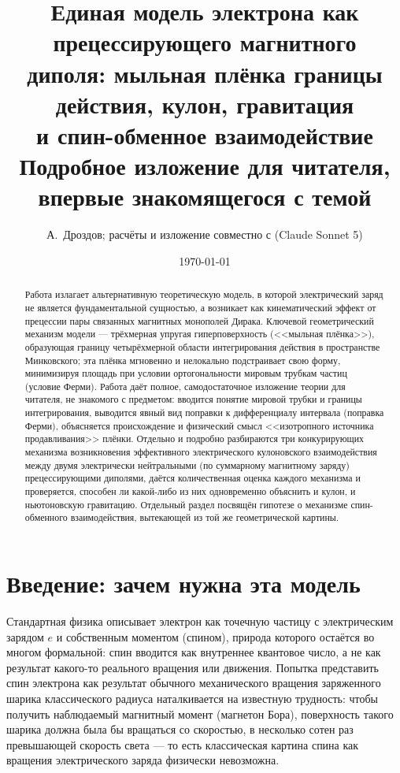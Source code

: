 \documentclass[12pt,a4paper]{article}
\title{Единая модель электрона как прецессирующего магнитного\\
диполя: мыльная плёнка границы действия, кулон, гравитация\\
и спин-обменное взаимодействие\\
\large Подробное изложение для читателя, впервые знакомящегося с темой}
\author{А.~Дроздов; расчёты и изложение совместно с (Claude Sonnet 5)}
\date{\today}
\begin{document}
\maketitle
\tableofcontents

\begin{abstract}
Работа излагает альтернативную теоретическую модель, в которой
электрический заряд не является фундаментальной сущностью, а
возникает как кинематический эффект от прецессии пары связанных
магнитных монополей Дирака. Ключевой геометрический механизм модели
--- трёхмерная упругая гиперповерхность (<<мыльная плёнка>>),
образующая границу четырёхмерной области интегрирования действия
в пространстве Минковского; эта плёнка мгновенно и нелокально
подстраивает свою форму, минимизируя площадь при условии
ортогональности мировым трубкам частиц (условие Ферми). Работа
даёт полное, самодостаточное изложение теории для читателя, не
знакомого с предметом: вводится понятие мировой трубки и границы
интегрирования, выводится явный вид поправки к дифференциалу
интервала (поправка Ферми), объясняется происхождение и физический
смысл <<изотропного источника продавливания>> плёнки. Отдельно и
подробно разбираются три конкурирующих механизма возникновения
эффективного электрического кулоновского взаимодействия между двумя
электрически нейтральными (по суммарному магнитному заряду)
прецессирующими диполями, даётся количественная оценка каждого
механизма и проверяется, способен ли какой-либо из них одновременно
объяснить и кулон, и ньютоновскую гравитацию. Отдельный раздел
посвящён гипотезе о механизме спин-обменного взаимодействия,
вытекающей из той же геометрической картины.
\end{abstract}

\section{Введение: зачем нужна эта модель}

Стандартная физика описывает электрон как точечную частицу с
электрическим зарядом $e$ и собственным моментом (спином), природа
которого остаётся во многом формальной: спин вводится как внутреннее
квантовое число, а не как результат какого-то реального вращения или
движения. Попытка представить спин электрона как результат обычного
механического вращения заряженного шарика классического радиуса
наталкивается на известную трудность: чтобы получить наблюдаемый
магнитный момент (магнетон Бора), поверхность такого шарика должна
была бы вращаться со скоростью, в несколько сотен раз превышающей
скорость света --- то есть классическая картина спина как вращения
электрического заряда физически невозможна.
\end{document}
